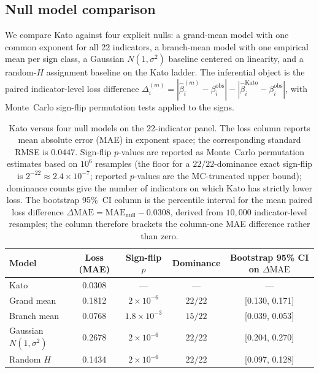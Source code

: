 \subsection{Null model comparison}
We compare Kato against four explicit nulls: a grand-mean model with one common
exponent for all 22 indicators, a branch-mean model with one empirical mean per
sign class, a Gaussian $N(1,\sigma^2)$ baseline centered on linearity, and a
random-$H$ assignment baseline on the Kato ladder. The inferential object is
the paired indicator-level loss difference
$\Delta_i^{(m)}=
|\hat{\beta}_i^{(m)}-\beta_i^{\mathrm{obs}}|
-|\hat{\beta}_i^{\mathrm{Kato}}-\beta_i^{\mathrm{obs}}|$,
with Monte~Carlo sign-flip permutation tests applied to the signs.

\begin{table}[t]
\caption{Kato versus four null models on the 22-indicator panel.
The loss column reports mean absolute error (MAE) in exponent space;
the corresponding standard RMSE is \(0.0447\).
Sign-flip \(p\)-values are reported as Monte~Carlo permutation estimates
based on $10^{6}$ resamples (the floor for a $22/22$-dominance exact
sign-flip is $2^{-22}\!\approx\!2.4\!\times\!10^{-7}$; reported $p$-values
are the MC-truncated upper bound); dominance counts give the number of indicators
on which Kato has strictly lower loss.  The bootstrap 95\%~CI column is the
percentile interval for the mean paired loss difference
\(\Delta\mathrm{MAE}=\mathrm{MAE}_{\mathrm{null}}-0.0308\),
derived from \(10{,}000\) indicator-level resamples; the column therefore
brackets the column-one MAE difference rather than zero.}
\label{tab:null_models}
\centering
\begin{tabular}{lcccc}
\toprule
Model & Loss (MAE) & Sign-flip \(p\) & Dominance & Bootstrap 95\% CI on \(\Delta\mathrm{MAE}\) \\
\midrule
Kato & 0.0308 & --- & --- & --- \\
Grand mean & 0.1812 & \(2\times 10^{-6}\) & \(22/22\) & [0.130, 0.171] \\
Branch mean & 0.0768 & \(1.8\times 10^{-3}\) & \(15/22\) & [0.039, 0.053] \\
Gaussian \(N(1,\sigma^2)\) & 0.2678 & \(2\times 10^{-6}\) & \(22/22\) & [0.204, 0.270] \\
Random \(H\) & 0.1434 & \(2\times 10^{-6}\) & \(22/22\) & [0.097, 0.128] \\
\bottomrule
\end{tabular}
\end{table}

